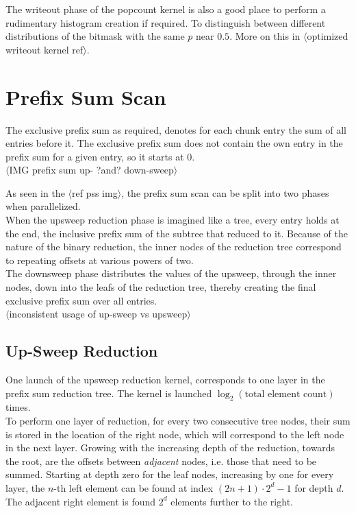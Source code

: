\documentclass{tudscrreprt}
\newcommand{\markr}[1]{\textcolor{review}{$\langle$#1$\rangle$}}
\begin{document}
			The writeout phase of the popcount kernel is also a good place to perform a rudimentary histogram creation if required. To distinguish between different distributions of the bitmask with the same $p$ near $0.5$. More on this in \markr{optimized writeout kernel ref}. \\
		
		\section{Prefix Sum Scan}
			The exclusive prefix sum as required, denotes for each chunk entry the sum of all entries before it. The exclusive prefix sum does not contain the own entry in the prefix sum for a given entry, so it starts at 0. \\
			
			\markr{IMG prefix sum up- ?and? down-sweep}
			
			As seen in the \markr{ref pss img}, the prefix sum scan can be split into two phases when parallelized. \\
			When the upsweep reduction phase is imagined like a tree, every entry holds at the end, the inclusive prefix sum of the subtree that reduced to it. Because of the nature of the binary reduction, the inner nodes of the reduction tree correspond to repeating offsets at various powers of two. \\
			The downsweep phase distributes the values of the upsweep, through the inner nodes, down into the leafs of the reduction tree, thereby creating the final exclusive prefix sum over all entries. \\
		
			\markr{inconsistent usage of up-sweep vs upsweep}\\
		
			\subsection{Up-Sweep Reduction}
				One launch of the upsweep reduction kernel, corresponds to one layer in the prefix sum reduction tree. The kernel is launched $\log_2(\text{total element count})$ times. \\
				To perform one layer of reduction, for every two consecutive tree nodes, their sum is stored in the location of the right node, which will correspond to the left node in the next layer. Growing with the increasing depth of the reduction, towards the root, are the offsets between \emph{adjacent} nodes, i.e. those that need to be summed. Starting at depth zero for the leaf nodes, increasing by one for every layer, the $n$-th left element can be found at index $(2n+1) \cdot 2^d -1$ for depth $d$. The adjacent right element is found $2^d$ elements further to the right. \\
				
\end{document}
